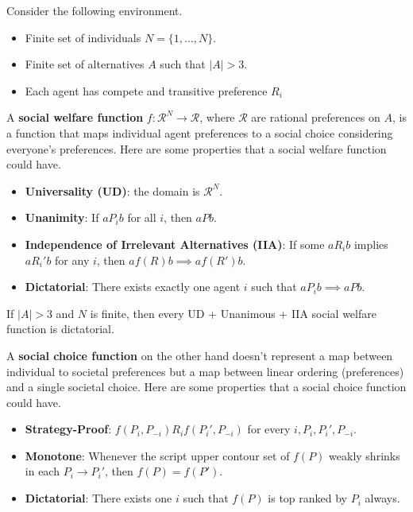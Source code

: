 \documentclass[11pt,english]{article}
\begin{document}
Consider the following environment. 
\begin{itemize}
\item Finite set of individuals $N = \{1, \ldots, N\}$.
\item Finite set of alternatives $A$ such that $|A| > 3$.
\item Each agent has compete and transitive preference $R_i$
\end{itemize}
\begin{definition}
A \textbf{social welfare function} $f:\mathcal{R}^N \to \mathcal{R}$, where $\mathcal{R}$ are rational preferences on $A$, is a function that maps individual agent preferences to a social choice considering everyone's preferences. Here are some properties that a social welfare function could have.
\begin{itemize}
\item \textbf{Universality (UD)}: the domain is $\mathcal{R}^N$.
\item \textbf{Unanimity}: If $a P_i b$ for all $i$, then $a Pb$.
\item \textbf{Independence of Irrelevant Alternatives (IIA)}: If some $aR_i b$ implies $aR_i' b$ for any $i$, then $a f(R) b \implies af(R')b$.
\item \textbf{Dictatorial}: There exists exactly one agent $i$ such that $aP_ib \implies aPb$.
\end{itemize}
\end{definition}
\begin{theorem}
If $|A| > 3$ and $N$ is finite, then every UD + Unanimous + IIA social welfare function is dictatorial.
\end{theorem}

\begin{definition}
A \textbf{social choice function} on the other hand doesn't represent a map between individual to societal preferences but a map between linear ordering (preferences) and a single societal choice. Here are some properties that a social choice function could have.
\begin{itemize}
\item \textbf{Strategy-Proof}: $f(P_i, P_{-i})R_if(P_i',P_{-i})$ for every $i, P_i, P_i', P_{-i}$.
\item \textbf{Monotone}: Whenever the script upper contour set of $f(P)$ weakly shrinks in each $P_i \to P_i'$, then $f(P) = f(P')$.
\item \textbf{Dictatorial}: There exists one $i$ such that $f(P)$ is top ranked by $P_i$ always.
\end{itemize}
\end{definition}
\end{document}
